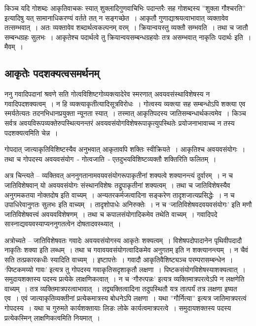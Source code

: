 		किञ्च यदि गोशब्दः आकृतिवाचकः स्यात्  शुक्लादिगुणवाचिभिः  पदान्तरैः सह गोशब्दस्य   ”शुक्ला गौश्चरति” इत्यादिषु यत् सामानाधिकरण्यं वर्तते तत् न सङ्गच्छेत~।  आकृतौ गुणाद्याश्रयत्वाभावात्  व्यक्तावेव तत्सम्भवात्~। अतः व्यक्तावेव शब्दार्थत्वकल्पनम्  वरम्~।  क्रियान्वयस्तु व्यक्तौ सम्भवति~। तथा च जातौ सम्बन्धग्रहः सुलभः~। आकृतेश्च पदार्थत्वे तु क्रियान्वयसम्बन्धग्रहयोः तत्र असम्भवात्  नाकृतिः पदार्थः इति~। मैवम्~।

		\subsection{आकृतेः पदशक्यत्वसमर्थनम्}

		ननु गवादिपदानां श्रवणे सति गोत्वविशिष्टगोव्यक्त्यादेरेव स्मरणात् अवयवसंस्थाविशेषस्य न गवादिपदशक्यत्वम्~। न हि व्यक्त्याकृतीत्यादिसूत्रविरोधः~। गोत्वस्य व्यक्त्या सह सम्बन्धोऽपि शक्त्या एव स्मर्यतेत्यतः तदनभिधानप्रयुक्ता न्यूनता स्यात्~। तस्मात् आकृतिपदस्य जातिसम्बन्धार्थकत्वमेव~। किञ्च सर्वत्र अवयविरूपव्यक्तेरुपस्थित्यनन्तरं अवयवसंयोगविशेषरूपाकृत्युपस्थितेः प्रयोजनाभावाच्च न तस्य पदशक्यत्वमिति चेन्न~।

		गोपदात् जात्याकृतिविशिष्टस्यैव अनुभवात् आकृतावपि शक्तिः स्वीक्रियते~। आकृतिश्च अवयवसंयोगः~।  तथा च गोपदस्य अवयवसंयोग~- गोत्वजाति~- एतदुभयविशिष्टव्यक्तौ शक्तिरिति फलितम्~।
				
		अत्र चिन्त्यते – व्यक्तिवत् अननुगतानामवयवसंयोगरूपाकृतीनां शक्यत्वे शक्यानन्त्यं दुर्वारम्~। न च जातिविशेषवान् यो अवयवसंयोगः संस्थानविशेषः तद्रूपाकृतीनां शक्यत्वम्~। तथा च जातिविशेषस्यैव अनुगमकतया नोक्तदोष इति वाच्यम्~। अन्यतरकर्मजत्वादिना सङ्करेण तादृशजात्यप्रसिद्धेः~। न च उपाधिरेवानुगतः सुलभः इति वाच्यम्~। तादृशोपाधेः अनिरुक्तेः~। न च ‘जातिविशेषवदवयवसंयोगः’ इति मणौ जातिविशेषवत्त्वं अवयवविशेषणम्~। तथा च कपालसंयोगादिकमेव तथेति वाच्यम्~। गवादिपदे सास्नाद्यवयवस्याप्यननुगतत्वेन दोषतादवस्थ्यात्~। 

		अत्रोच्यते – जातिविशेषवतः गवादेः अवयवसंयोगस्य आकृतेः शक्यत्वम्~। विशेषपदोपादानेन पृथिवीपदादौ नाकृतिः शक्या इति लब्धम्~। तथा च गवावयवसंयोगत्वादिकमेव अनुगतम् इति न शक्त्यानन्त्यम्~। न चैवं सति तत्प्रकारकधीः स्यादिति वाच्यम्~। इष्टापत्तेः~। गवादौ आकृतिवैशिष्ट्यञ्च परम्परासम्बन्धेन~। ‘पिष्टकमय्यो गावः’ इत्यत्र तु गोपदस्य गवाकृतिसदृशाकृतौ लक्षणा~। पिष्टकसंयोगविशेषस्याशक्यत्वात्~। समुदायशक्तस्य पदस्य प्रत्येके लाक्षणिकत्वात्~। न च ‘गौरुत्पन्नः’ इत्यत्र व्यक्तिमात्रपरत्वेऽपि न लक्षणेति वाच्यम्~। तत्र व्यक्तिमात्रपरत्वाभावात्~। तद्व्यक्तित्वादिना तदुपस्थितौ यत्र तात्पर्यं तत्र लक्षणा इष्यत एव~।  एवं जात्याकृतिव्यक्तीनां प्रत्येकमात्रस्य बोधनेऽपि लक्षणा~।  यथा ”गौर्नित्या” इत्यत्र जातिमात्रपरत्वं गोपदस्य~।  यथा च गुरुमते कार्यशक्तायाः लिङः लोके  कार्यत्वमात्रपरत्वे~।  समुदायशक्तस्य पदस्य प्रत्येकस्मिन् लाक्षणिकत्वमिति नियमात्~।

